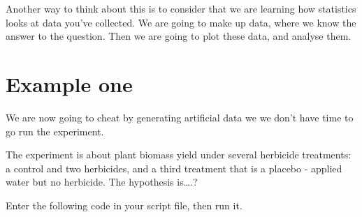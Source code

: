 \documentclass[
]{book}
\newenvironment{Shaded}{\begin{snugshade}}{\end{snugshade}}
\newcommand{\AttributeTok}[1]{\textcolor[rgb]{0.77,0.63,0.00}{#1}}
\newcommand{\CommentTok}[1]{\textcolor[rgb]{0.56,0.35,0.01}{\textit{#1}}}
\newcommand{\DecValTok}[1]{\textcolor[rgb]{0.00,0.00,0.81}{#1}}
\newcommand{\FunctionTok}[1]{\textcolor[rgb]{0.00,0.00,0.00}{#1}}
\newcommand{\NormalTok}[1]{#1}
\newcommand{\OtherTok}[1]{\textcolor[rgb]{0.56,0.35,0.01}{#1}}
\newcommand{\SpecialCharTok}[1]{\textcolor[rgb]{0.00,0.00,0.00}{#1}}
\newcommand{\StringTok}[1]{\textcolor[rgb]{0.31,0.60,0.02}{#1}}
\begin{document}
Another way to think about this is to consider that we are learning how statistics looks at data you've collected. We are going to make up data, where we know the answer to the question. Then we are going to plot these data, and analyse them.

\hypertarget{example-one}{%
\section{Example one}\label{example-one}}

We are now going to cheat by generating artificial data we we don't have time to go run the experiment.

The experiment is about plant biomass yield under several herbicide treatments: a control and two herbicides, and a third treatment that is a placebo - applied water but no herbicide. The hypothesis is\ldots.?

Enter the following code in your script file, then run it.

\begin{Shaded}
\end{Shaded}
\end{document}
